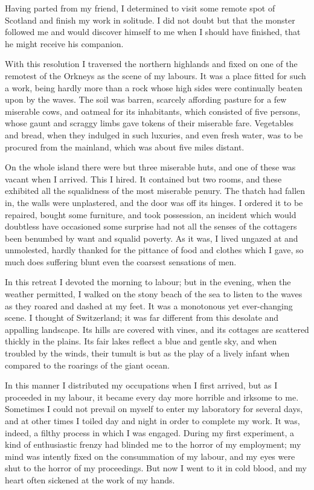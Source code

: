 \documentclass[12pt,openright]{book}
\begin{document}
Having parted from my friend, I determined to visit some remote spot of Scotland and finish my work in solitude. I did not doubt but that the monster followed me and would discover himself to me when I should have finished, that he might receive his companion.

With this resolution I traversed the northern highlands and fixed on one of the remotest of the Orkneys as the scene of my labours. It was a place fitted for such a work, being hardly more than a rock whose high sides were continually beaten upon by the waves. The soil was barren, scarcely affording pasture for a few miserable cows, and oatmeal for its inhabitants, which consisted of five persons, whose gaunt and scraggy limbs gave tokens of their miserable fare. Vegetables and bread, when they indulged in such luxuries, and even fresh water, was to be procured from the mainland, which was about five miles distant.

On the whole island there were but three miserable huts, and one of these was vacant when I arrived. This I hired. It contained but two rooms, and these exhibited all the squalidness of the most miserable penury. The thatch had fallen in, the walls were unplastered, and the door was off its hinges. I ordered it to be repaired, bought some furniture, and took possession, an incident which would doubtless have occasioned some surprise had not all the senses of the cottagers been benumbed by want and squalid poverty. As it was, I lived ungazed at and unmolested, hardly thanked for the pittance of food and clothes which I gave, so much does suffering blunt even the coarsest sensations of men.

In this retreat I devoted the morning to labour; but in the evening, when the weather permitted, I walked on the stony beach of the sea to listen to the waves as they roared and dashed at my feet. It was a monotonous yet ever-changing scene. I thought of Switzerland; it was far different from this desolate and appalling landscape. Its hills are covered with vines, and its cottages are scattered thickly in the plains. Its fair lakes reflect a blue and gentle sky, and when troubled by the winds, their tumult is but as the play of a lively infant when compared to the roarings of the giant ocean.

In this manner I distributed my occupations when I first arrived, but as I proceeded in my labour, it became every day more horrible and irksome to me. Sometimes I could not prevail on myself to enter my laboratory for several days, and at other times I toiled day and night in order to complete my work. It was, indeed, a filthy process in which I was engaged. During my first experiment, a kind of enthusiastic frenzy had blinded me to the horror of my employment; my mind was intently fixed on the consummation of my labour, and my eyes were shut to the horror of my proceedings. But now I went to it in cold blood, and my heart often sickened at the work of my hands.
\end{document}
